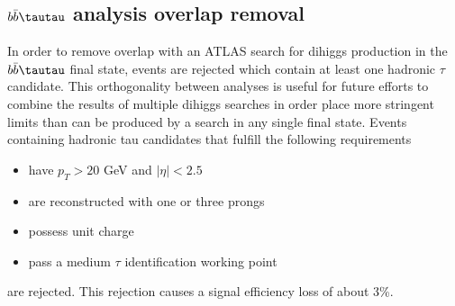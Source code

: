 \subsection{$b\bar{b}\tautau$ analysis overlap removal}
In order to remove overlap with an ATLAS search for dihiggs production in the $b\bar{b}\tautau$ final state, events are rejected which contain at least one hadronic $\tau$ candidate. This orthogonality between analyses is useful for future efforts to combine the results of multiple dihiggs searches in order place more stringent limits than can be produced by a search in any single final state. Events containing hadronic tau candidates that fulfill the following requirements
\begin{itemize}
\item have $p_T > 20$ GeV and $|\eta| < 2.5$
\item are reconstructed with one or three prongs
\item possess unit charge
\item pass a medium $\tau$ identification working point
\end{itemize}
are rejected. This rejection causes a signal efficiency loss of about 3\%.

